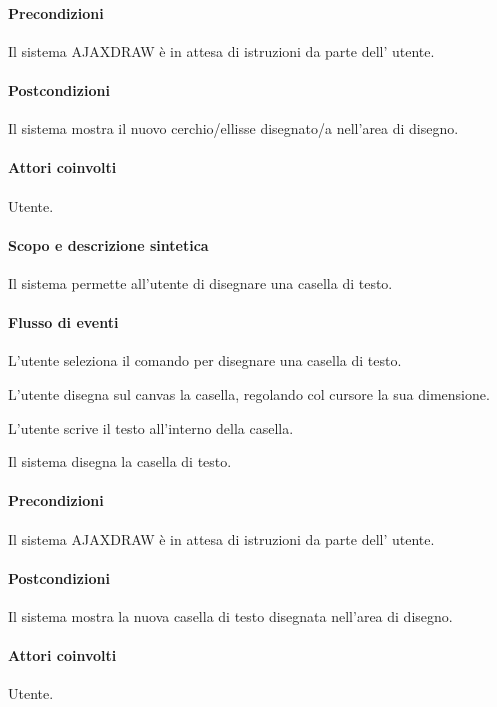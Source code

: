 \paragraph{Precondizioni} Il sistema AJAXDRAW \`e in attesa di istruzioni da parte dell' utente.
\paragraph{Postcondizioni} Il sistema mostra il nuovo cerchio/ellisse disegnato/a nell'area di disegno.

\paragraph{Attori coinvolti} Utente.
\paragraph{Scopo e descrizione sintetica} 
Il sistema permette all'utente di disegnare una casella di testo.
\paragraph{Flusso di eventi}
\begin{elenconumerato}[\textbf{}]{\subsubsecindent}
\item L'utente seleziona il comando per disegnare una casella di testo.
\item L'utente disegna sul canvas la casella, regolando col cursore la sua dimensione.
\item L'utente scrive il testo all'interno della casella.
\item Il sistema disegna la casella di testo.
\end{elenconumerato}
\paragraph{Precondizioni} Il sistema AJAXDRAW \`e in attesa di istruzioni da parte dell' utente.
\paragraph{Postcondizioni} Il sistema mostra la nuova casella di testo disegnata nell'area di disegno.

\paragraph{Attori coinvolti} Utente.
